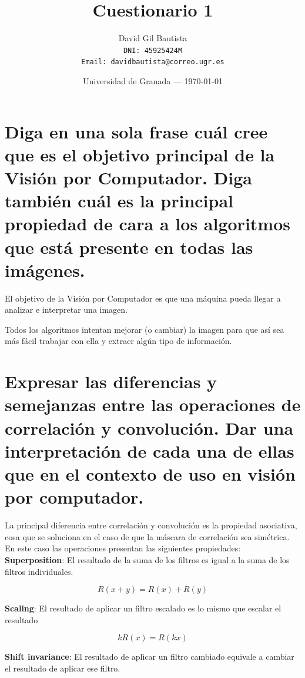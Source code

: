 \documentclass{article}
\title{Cuestionario 1} %
\author{David Gil Bautista\\ \texttt{DNI: 45925424M}\\ \texttt{Email: davidbautista@correo.ugr.es}} %
\date{Universidad de Granada --- \today} %
\begin{document}
\maketitle %


\section{Diga en una sola frase cuál cree que es el objetivo principal de la Visión por Computador. Diga también cuál es la principal propiedad de cara a los algoritmos que está presente en todas las imágenes.}
El objetivo de la Visión por Computador es que una máquina pueda llegar a analizar e interpretar una imagen.

Todos los algoritmos intentan mejorar (o cambiar) la imagen para que así sea más fácil trabajar con ella y extraer algún tipo de información.

\section{Expresar las diferencias y semejanzas entre las operaciones de correlación y convolución. Dar una interpretación de cada una de ellas que en el contexto de uso en visión por computador.}
La principal diferencia entre correlación y convolución es la propiedad asociativa, cosa que se soluciona en el caso de que la máscara de correlación sea simétrica. En este caso las operaciones presentan las siguientes propiedades:\\
 
 
\textbf{Superposition}: El resultado de la suma de los filtros es igual a la suma de los filtros individuales.

\begin{equation}
R(x + y) = R(x) + R(y)
\end{equation}

\textbf{Scaling}: El resultado de aplicar un filtro escalado es lo mismo que escalar el resultado

\begin{equation}
kR(x) = R(kx)
\end{equation}

\textbf{Shift invariance}: El resultado de aplicar un filtro cambiado equivale a cambiar el resultado de aplicar ese filtro.
\end{document}
